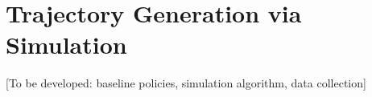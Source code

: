 \chapter{Trajectory Generation via Simulation}
\label{chap:simulation}

[To be developed: baseline policies, simulation algorithm, data collection]